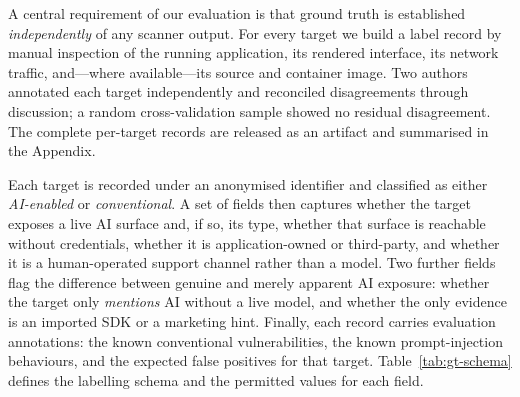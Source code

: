 A central requirement of our evaluation is that ground truth is established
\emph{independently} of any scanner output. For every target we build a label
record by manual inspection of the running application, its rendered
interface, its network traffic, and—where available—its source and container
image. Two authors annotated each target independently and reconciled
disagreements through discussion; a random cross-validation sample showed no
residual disagreement. The complete per-target records are released as an
artifact and summarised in the Appendix.

Each target is recorded under an anonymised identifier and classified as
either \emph{AI-enabled} or \emph{conventional}. A set of fields then captures
whether the target exposes a live AI surface and, if so, its type, whether
that surface is reachable without credentials, whether it is application-owned
or third-party, and whether it is a human-operated support channel rather than
a model. Two further fields flag the difference between genuine and merely
apparent AI exposure: whether the target only \emph{mentions} AI without a live
model, and whether the only evidence is an imported SDK or a marketing hint.
Finally, each record carries evaluation annotations: the known conventional
vulnerabilities, the known prompt-injection behaviours, and the expected false
positives for that target. Table~\ref{tab:gt-schema} defines the labelling
schema and the permitted values for each field.

